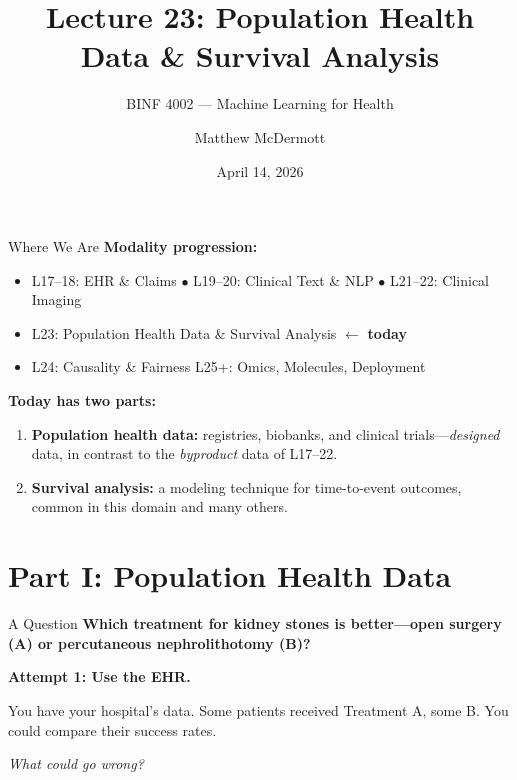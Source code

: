 \documentclass[aspectratio=169,10pt]{beamer}
\title{Lecture 23: Population Health Data \& Survival Analysis}
\subtitle{BINF 4002 --- Machine Learning for Health}
\author{Matthew McDermott}
\institute{Dept.\ of Biomedical Informatics, Columbia University}
\date{April 14, 2026}
\begin{document}
\begin{frame}[noframenumbering]
\maketitle
\end{frame}

\begin{frame}{Where We Are}
\textbf{Modality progression:}
\begin{itemize}
    \item[\textcolor{columbiagray}{$\bullet$}] L17--18: EHR \& Claims \quad
          \textcolor{columbiagray}{$\bullet$} L19--20: Clinical Text \& NLP \quad
          \textcolor{columbiagray}{$\bullet$} L21--22: Clinical Imaging
    \item[\textcolor{columbiaaccent}{$\to$}] \alert{L23: Population Health Data \& Survival Analysis} $\gets$ \textbf{today}
    \item[\textcolor{columbiagray}{$\circ$}] L24: Causality \& Fairness \quad L25+: Omics, Molecules, Deployment
\end{itemize}

\vspace{0.3em}
\textbf{Today has two parts:}
\begin{enumerate}
    \item \textbf{Population health data:} registries, biobanks, and clinical trials---\emph{designed} data, in contrast to the \emph{byproduct} data of L17--22.
    \item \textbf{Survival analysis:} a modeling technique for time-to-event outcomes, common in this domain and many others.
\end{enumerate}
\end{frame}

\section{Part I: Population Health Data}

\begin{frame}{A Question}
\textbf{Which treatment for kidney stones is better---open surgery (A) or percutaneous nephrolithotomy (B)?}

\vspace{0.3em}
\textbf{Attempt 1: Use the EHR.}

You have your hospital's data. Some patients received Treatment A, some B. You could compare their success rates.

\vspace{0.3em}
\textit{What could go wrong?}
\end{frame}
\end{document}
